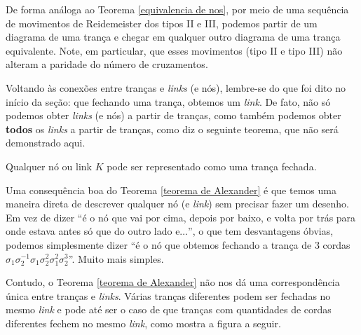 	\par\vspace{0.3cm} De forma análoga ao Teorema \eqref{equivalencia de nos}, por meio de uma sequência de movimentos de Reidemeister dos tipos II e III, podemos partir de um diagrama de uma trança e chegar em qualquer outro diagrama de uma trança equivalente. Note, em particular, que esses movimentos (tipo II e tipo III) não alteram a paridade do número de cruzamentos. 
	\par\vspace{0.3cm} Voltando às conexões entre tranças e \textit{links} (e nós), lembre-se do que foi dito no início da seção: que fechando uma trança, obtemos um \textit{link}. De fato, não só podemos obter \textit{links} (e nós) a partir de tranças, como também podemos obter \textbf{todos} os \textit{links} a partir de tranças, como diz o seguinte teorema, que não será demonstrado aqui.
	
	\begin{theorem}[Alexander]
		\label{teorema de Alexander}
		Qualquer nó ou link $K$ pode ser representado como uma trança fechada.
	\end{theorem}
	
	\par\vspace{0.3cm} Uma consequência boa do Teorema \eqref{teorema de Alexander} é que temos uma maneira direta de descrever qualquer nó (e \textit{link}) sem precisar fazer um desenho. Em vez de dizer ``é o nó que vai por cima, depois por baixo, e volta por trás para onde estava antes só que do outro lado e$\dots$'', o que tem desvantagens óbvias, podemos simplesmente dizer ``é o nó que obtemos fechando a trança de 3 cordas $\sigma_1\sigma_2^{-1}\sigma_1\sigma_2^2\sigma_1^2\sigma_2^3$''. Muito mais simples.
	\par\vspace{0.3cm} Contudo, o Teorema \eqref{teorema de Alexander} não nos dá uma correspondência única entre tranças e \textit{links}. Várias tranças diferentes podem ser fechadas no mesmo \textit{link} e pode até ser o caso de que tranças com quantidades de cordas diferentes fechem no mesmo \textit{link}, como mostra a figura a seguir.
	
